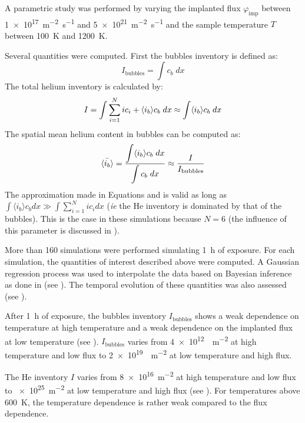 A parametric study was performed by varying the implanted flux $\varphi_\mathrm{imp}$ between \SI{1e17}{m^{-2} s^{-1}} and \SI{5e21}{m^{-2} s^{-1}} and the sample temperature $T$ between \SI{100}{K} and \SI{1200}{K}.

Several quantities were computed.
First the bubbles inventory is defined as:
\begin{equation}
    I_\mathrm{bubbles}= \displaystyle \int c_b \; dx
\end{equation}
The total helium inventory is calculated by:
\begin{equation}
        I = \displaystyle \int \sum\limits_{i=1}^N i c_i + \langle i_b \rangle c_b \; dx
        \approx \displaystyle \int \langle i_b \rangle c_b \; dx
    \labeq{I}
\end{equation}
The spatial mean helium content in bubbles can be computed as:
\begin{equation}
        \Bar{\langle i_b \rangle} = \frac{\displaystyle \int \langle i_b \rangle c_b \; dx}{\displaystyle \int c_b \; dx}
        \approx \frac{I}{I_\mathrm{bubbles}}
    \labeq{mean ib}
\end{equation}
The approximation made in Equations  and  is valid as long as $\int \langle i_b \rangle c_b dx \gg  \int \sum\limits_{i=1}^N i c_i dx$ (\textit{ie} the He inventory is dominated by that of the bubbles).
This is the case in these simulations because $N=6$ (the influence of this parameter is discussed in ).

More than 160 simulations were performed simulating \SI{1}{h} of exposure.
For each simulation, the quantities of interest described above were computed.
A Gaussian regression process  was used to interpolate the data based on Bayesian inference as done in  (see ).
The temporal evolution of these quantities was also assessed (see ).

After \SI{1}{h} of exposure, the bubbles inventory $I_\mathrm{bubbles}$ shows a weak dependence on temperature at high temperature and a weak dependence on the implanted flux at low temperature (see ).
$I_\mathrm{bubbles}$ varies from \SI{4e12}{ m^{-2}} at high temperature and low flux to \SI{2e19}{ m^{-2}} at low temperature and high flux.

The He inventory $I$ varies from \SI{8e16}{m^{-2}} at high temperature and low flux to \SI{e25}{m^{-2}} at low temperature and high flux (see ).
For temperatures above \SI{600}{K}, the temperature dependence is rather weak compared to the flux dependence.

